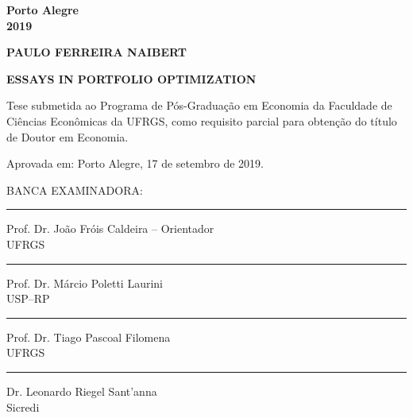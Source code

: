 \documentclass[12pt,oneside,a4paper]{memoir}
\begin{document}
\begin{center}
\textbf{Porto Alegre
\\
2019}
\end{center}

\clearpage



\clearpage

\begin{center}
\textbf{PAULO FERREIRA NAIBERT}
\end{center}

\vspace{3 em}

\begin{center}
\textbf{ESSAYS IN PORTFOLIO OPTIMIZATION}
\end{center}

\vspace{3 em}
\hfill  
\begin{minipage}{.5\textwidth}
\begin{SingleSpace}
Tese submetida ao Programa de Pós-Graduação em Economia da Faculdade de Ciências Econômicas da UFRGS, como requisito parcial para obtenção do título de Doutor em Economia.
\end{SingleSpace}
\end{minipage}
\vfill

\noindent
Aprovada em: Porto Alegre, 17 de setembro de 2019.\\

\vfill

\noindent
BANCA EXAMINADORA:
%

\noindent
\rule{\textwidth}{1pt}
Prof. Dr. João Fróis Caldeira -- Orientador\\
UFRGS

\noindent
\rule{\textwidth}{1pt}
Prof. Dr. Márcio Poletti Laurini\\
USP--RP

\noindent
\rule{\textwidth}{1pt}
Prof. Dr. Tiago Pascoal Filomena\\
UFRGS

\noindent
\rule{\textwidth}{1pt}
Dr. Leonardo Riegel Sant'anna\\
Sicredi\\

\clearpage
\end{document}
